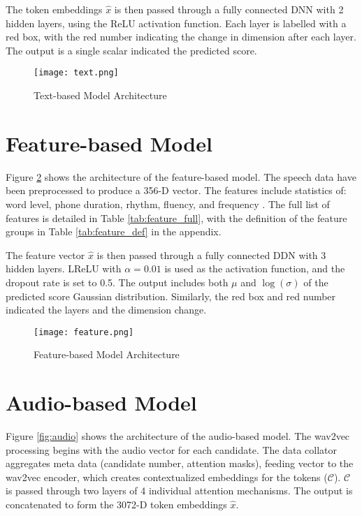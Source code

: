 The token embeddings $\hat{x}$ is then passed through a fully connected DNN with 2 hidden layers, using the ReLU activation function. Each layer is labelled with a red box, with the red number indicating the change in dimension after each layer. The output is a single scalar indicated the predicted score.

\begin{figure}[H]
    \centering
    \texttt{[image: text.png]}
    \caption{Text-based Model Architecture}
    \label{fig:text}
\end{figure}

\section{Feature-based Model}
Figure \ref{fig:feature} shows the architecture of the feature-based model. The speech data have been preprocessed to produce a 356-D vector. The features include statistics of: word level, phone duration, rhythm, fluency, and frequency \cite{graders}. The full list of features is detailed in Table \ref{tab:feature_full}, with the definition of the feature groups in Table \ref{tab:feature_def} in the appendix.

The feature vector $\hat{x}$ is then passed through a fully connected DDN with 3 hidden layers. LReLU with $\alpha = 0.01$ is used as the activation function, and the dropout rate is set to 0.5. The output includes both $\mu$ and $\log(\sigma)$ of the predicted score Gaussian distribution. Similarly, the red box and red number indicated the layers and the dimension change.

\begin{figure}[H]
    \centering
    \texttt{[image: feature.png]}
    \caption{Feature-based Model Architecture}
    \label{fig:feature}
\end{figure}

\section{Audio-based Model}
Figure \ref{fig:audio} shows the architecture of the audio-based model. The wav2vec processing begins with the audio vector for each candidate. The data collator aggregates meta data (candidate number, attention masks), feeding vector to the wav2vec encoder, which creates contextualized embeddings for the tokens ($\mathcal{C}$). $\mathcal{C}$ is passed through two layers of 4 individual attention mechanisms. The output is concatenated to form the 3072-D token embeddings $\hat{x}$.

